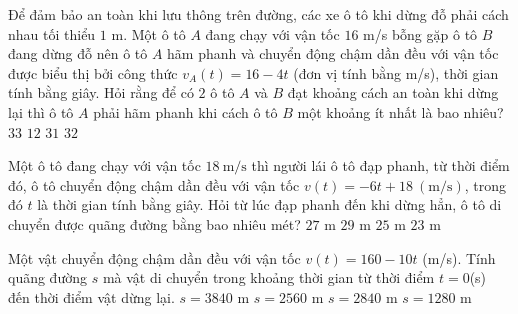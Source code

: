 \begin{ex}%
	Để đảm bảo an toàn khi lưu thông trên đường, các xe ô tô khi dừng đỗ phải cách nhau tối thiểu $1$ m. Một ô tô $A$ đang chạy với vận tốc $16$ m/s bỗng gặp ô tô $B$ đang dừng đỗ nên ô tô $A$ hãm phanh và chuyển động chậm dần đều với vận tốc  được biểu thị bởi công thức $v_A(t)=16-4t$ (đơn vị tính bằng m/s), thời gian tính bằng giây. Hỏi rằng để có $2$ ô tô $A$ và $B$ đạt khoảng cách an toàn khi dừng lại thì ô tô $A$ phải hãm phanh khi cách ô tô $B$ một khoảng ít nhất là bao nhiêu?
	 \choice
		{\True $33$} 
		 {$12$}
		 {$31$}
		 {$32$}
\end{ex}

\begin{ex}%
	Một ô tô đang chạy với vận tốc $18\ \mathrm{m/s}$ thì người lái ô tô đạp phanh, từ thời điểm đó, ô tô chuyển động chậm dần đều với vận tốc $v(t) = -6t + 18\ (\mathrm{m/s})$, trong đó $t$ là thời gian tính bằng giây. Hỏi từ lúc đạp phanh đến khi dừng hẳn, ô tô di chuyển được quãng đường bằng bao  nhiêu mét?
	 \choice
		{\True $27$  m}
		{$29$  m}
		 {$25$ m}
		 {$23$ m}
\end{ex}

\begin{ex}%
	Một vật chuyển động chậm dần đều với vận tốc $v(t)=160-10t$ (m/s). Tính quãng đường $s$ mà vật di chuyển trong khoảng thời gian từ thời  điểm $t=0$(s) đến thời điểm vật dừng lại.
	\choice 
		 {$s=3840$ m}
		 {$s=2560$ m}
		{$s=2840$  m}
		 {\True $s=1280$ m}
\end{ex}

